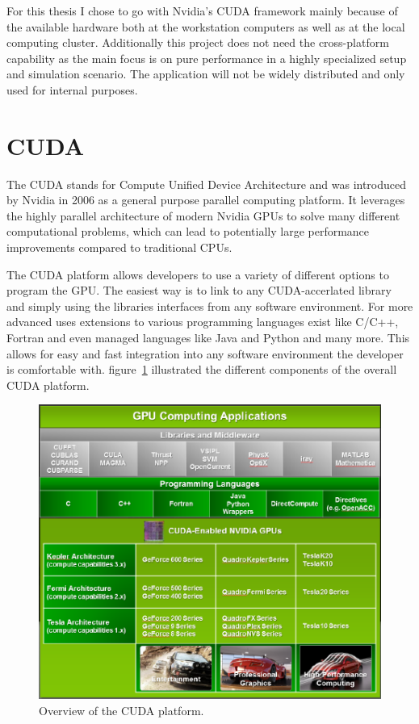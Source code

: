 \documentclass[a4paper,11pt]{kth-mag}
\begin{document}
For this thesis I chose to go with Nvidia's CUDA framework mainly because of the available hardware both at the workstation computers as well as at the local computing cluster. Additionally this project does not need the cross-platform capability as the main focus is on pure performance in a highly specialized setup and simulation scenario. The application will not be widely distributed and only used for internal purposes.

\section{CUDA}
\label{sec:CUDA}
The CUDA stands for Compute Unified Device Architecture and was introduced by Nvidia in 2006 as a general purpose parallel computing platform. It leverages the highly parallel architecture of modern Nvidia GPUs to solve many different computational problems, which can lead to potentially large performance improvements compared to traditional CPUs.

The CUDA platform allows developers to use a variety of different options to program the GPU. The easiest way is to link to any CUDA-accerlated library and simply using the libraries interfaces from any software environment. For more advanced uses extensions to various programming languages exist like C/C++, Fortran and even managed languages like Java and Python and many more. This allows for easy and fast integration into any software environment the developer is comfortable with. figure~\ref{fig:cuda_overview} illustrated the different components of the overall CUDA platform.

\begin{figure}[!htbp]
  \centering
  \includegraphics[width=\textwidth]{img/cuda_overview.pdf}
  \caption{Overview of the CUDA platform.}
  \label{fig:cuda_overview}
\end{figure}
\end{document}
